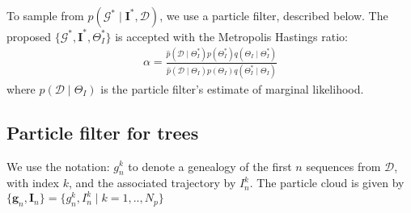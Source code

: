 \documentclass[a4paper,18pt]{report}
\begin{document}
To sample from $p(\mathcal{G}^* \mid \mathbf{I}^*, \mathcal{D})$, we use a particle filter, described below. The proposed $\{\mathcal{G}^*, \mathbf{I}^* , \Theta_I^*\}$ is accepted 
with the Metropolis Hastings ratio:
\begin{eqnarray}
\alpha = \frac{\hat{p}(\mathcal{D} \mid \Theta_I^*)p(\Theta_I^*)q(\Theta_I\mid \Theta_I^*)}{\hat{p}(\mathcal{D} \mid \Theta_I)p(\Theta_I)q(\Theta_I^*\mid \Theta_I) }
\end{eqnarray}
where $\hat{p}(\mathcal{D} \mid \Theta_I)$ is the particle filter's estimate of marginal likelihood. 

\subsection{Particle filter for trees}
We use the notation: $g_n^k$ to denote a genealogy of the first $n$ sequences from $\mathcal{D}$, with index $k$, and the associated trajectory by $I_n^k$. The particle cloud is
given by $\{\mathbf{g}_n, \mathbf{I}_n\}=\{g_n^k,  I_n^k \mid k=1,..,N_p\}$  
\end{document}
